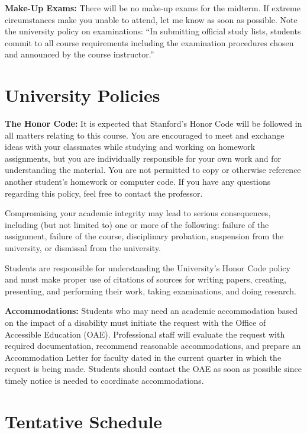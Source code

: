 \documentclass[11pt,letterpaper]{article}
\begin{document}
\medskip
\noindent
\textbf{Make-Up Exams:} There will be no make-up exams for the midterm. If extreme circumstances make you unable to attend, let me know as soon as possible. Note the university policy on examinations: ``In submitting official study lists, students commit to all course requirements including the examination procedures chosen and announced by the course instructor.''

\section*{University Policies}

\textbf{The Honor Code:} It is expected that Stanford's Honor Code will be followed in all matters relating to this course. You are encouraged to meet and exchange ideas with your classmates while studying and working on homework assignments, but you are individually responsible for your own work and for understanding the material. You are not permitted to copy or otherwise reference another student's homework or computer code. If you have any questions regarding this policy, feel free to contact the professor.

Compromising your academic integrity may lead to serious consequences, including (but not limited to) one or more of the following: failure of the assignment, failure of the course, disciplinary probation, suspension from the university, or dismissal from the university.

Students are responsible for understanding the University's Honor Code policy and must make proper use of citations of sources for writing papers, creating, presenting, and performing their work, taking examinations, and doing research.

\medskip
\noindent
\textbf{Accommodations:} Students who may need an academic accommodation based on the impact of a disability must initiate the request with the Office of Accessible Education (OAE). Professional staff will evaluate the request with required documentation, recommend reasonable accommodations, and prepare an Accommodation Letter for faculty dated in the current quarter in which the request is being made. Students should contact the OAE as soon as possible since timely notice is needed to coordinate accommodations.


\section*{Tentative Schedule}
\end{document}
